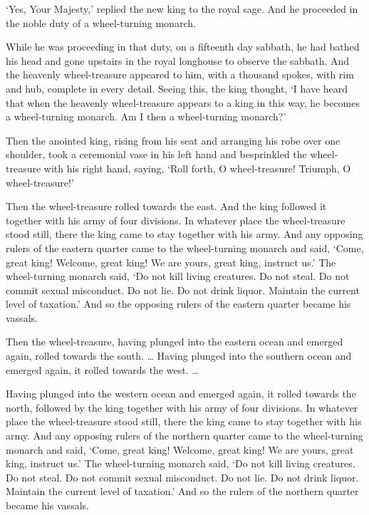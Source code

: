 \documentclass[12pt,openany]{book}%
\begin{document}
‘Yes, Your Majesty,’ replied the new king to the royal sage. And he proceeded in the noble duty of a wheel-turning monarch. 

While he was proceeding in that duty, on a fifteenth day sabbath, he had bathed his head and gone upstairs in the royal longhouse to observe the sabbath. And the heavenly wheel-treasure appeared to him, with a thousand spokes, with rim and hub, complete in every detail. Seeing this, the king thought, ‘I have heard that when the heavenly wheel-treasure appears to a king in this way, he becomes a wheel-turning monarch. Am I then a wheel-turning monarch?’ 

Then the anointed king, rising from his seat and arranging his robe over one shoulder, took a ceremonial vase in his left hand and besprinkled the wheel-treasure with his right hand, saying, ‘Roll forth, O wheel-treasure! Triumph, O wheel-treasure!’ 

Then the wheel-treasure rolled towards the east. And the king followed it together with his army of four divisions. In whatever place the wheel-treasure stood still, there the king came to stay together with his army. And any opposing rulers of the eastern quarter came to the wheel-turning monarch and said, ‘Come, great king! Welcome, great king! We are yours, great king, instruct us.’ The wheel-turning monarch said, ‘Do not kill living creatures. Do not steal. Do not commit sexual misconduct. Do not lie. Do not drink liquor. Maintain the current level of taxation.’ And so the opposing rulers of the eastern quarter became his vassals. 

Then the wheel-treasure, having plunged into the eastern ocean and emerged again, rolled towards the south. … Having plunged into the southern ocean and emerged again, it rolled towards the west. … 

Having plunged into the western ocean and emerged again, it rolled towards the north, followed by the king together with his army of four divisions. In whatever place the wheel-treasure stood still, there the king came to stay together with his army. And any opposing rulers of the northern quarter came to the wheel-turning monarch and said, ‘Come, great king! Welcome, great king! We are yours, great king, instruct us.’ The wheel-turning monarch said, ‘Do not kill living creatures. Do not steal. Do not commit sexual misconduct. Do not lie. Do not drink liquor. Maintain the current level of taxation.’ And so the rulers of the northern quarter became his vassals. 
\end{document}
